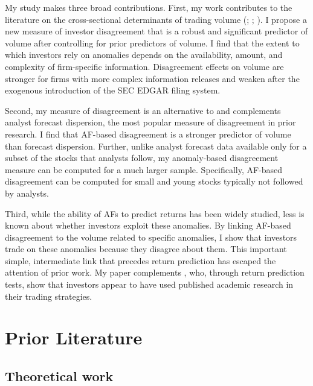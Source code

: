 \documentclass[
  12pt,
  a4paper,
  twoside,
  onecolumn]{article}
\begin{document}
My study makes three broad contributions. First, my work contributes to
the literature on the cross-sectional determinants of trading volume
(\cite{chordia_etal2006}; \cite{carlin_etal2014};
\cite{jacobs_hillert2015}). I propose a new measure of investor
disagreement that is a robust and significant predictor of volume after
controlling for prior predictors of volume. I find that the extent to
which investors rely on anomalies depends on the availability, amount,
and complexity of firm-specific information. Disagreement effects on
volume are stronger for firms with more complex information releases and
weaken after the exogenous introduction of the SEC EDGAR filing system.

Second, my measure of disagreement is an alternative to and complements
analyst forecast dispersion, the most popular measure of disagreement in
prior research. I find that AF-based disagreement is a stronger
predictor of volume than forecast dispersion. Further, unlike analyst
forecast data available only for a subset of the stocks that analysts
follow, my anomaly-based disagreement measure can be computed for a much
larger sample. Specifically, AF-based disagreement can be computed for
small and young stocks typically not followed by analysts.

Third, while the ability of AFs to predict returns has been widely
studied, less is known about whether investors exploit these anomalies.
By linking AF-based disagreement to the volume related to specific
anomalies, I show that investors trade on these anomalies because they
disagree about them. This important simple, intermediate link that
precedes return prediction has escaped the attention of prior work. My
paper complements \cite{mclean_pontiff2016}, who, through return
prediction tests, show that investors appear to have used published
academic research in their trading strategies.

\hypertarget{sec:lit}{%
\section{Prior Literature}\label{sec:lit}}

\hypertarget{theoretical-work}{%
\subsection{Theoretical work}\label{theoretical-work}}
\end{document}
